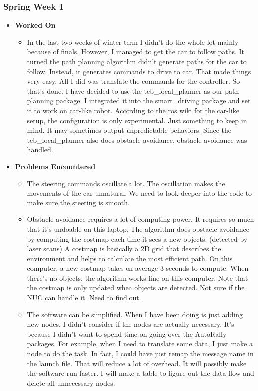 \documentclass[compsoc,draftclsnofoot,onecolumn,10pt]{IEEEtran}
\begin{document}
\subsubsection{Spring Week 1}
\begin{itemize}
    \item {\textbf{Worked On}}
    \begin{itemize}
      \item In the last two weeks of winter term I didn't do the whole lot
      mainly because of finals. However, I managed to get the car to follow
      paths. It turned the path planning algorithm didn't generate paths for
      the car to follow. Instead, it generates commands to drive to car. That
      made things very easy. All I did was translate the commands for the
      controller. So that's done. I have decided to use the teb\_local\_planner
      as our path planning package. I integrated it into the smart\_driving
      package and set it to work on car-like robot. According to the ros wiki
      for the car-like setup, the configuration is only experimental. Just
      something to keep in mind. It may sometimes output unpredictable behaviors.
      Since the teb\_local\_planner also does obstacle avoidance, obstacle
      avoidance was handled.
    \end{itemize}

    \item {\textbf{Problems Encountered}}
    \begin{itemize}
      \item The steering commands oscillate a lot. The oscillation makes the
      movements of the car unnatural. We need to look deeper into the code
      to make sure the steering is smooth.
      \item Obstacle avoidance requires a lot of computing power. It requires
      so much that it's undoable on this laptop. The algorithm does obstacle
      avoidance by computing the costmap each time it sees a new objects.
      (detected by laser scans) A costmap is basically a 2D grid that describes
      the environment and helps to calculate the most efficient path. On this
      computer, a new costmap takes on average 3 seconds to compute. When
      there's no objects, the algorithm works fine on this computer. Note that
      the costmap is only updated when objects are detected. Not sure if the
      NUC can handle it. Need to find out.
      \item The software can be simplified. When I have been doing is just
      adding new nodes. I didn't consider if the nodes are actually necessary.
      It's because I didn't want to spend time on going over the AutoRally
      packages. For example, when I need to translate some data, I just make
      a node to do the task. In fact, I could have just remap the message
      name in the launch file. That will reduce a lot of overhead. It will
      possibly make the software run faster. I will make a table to figure
      out the data flow and delete all unnecessary nodes.
    \end{itemize}


\end{itemize}
\end{document}
